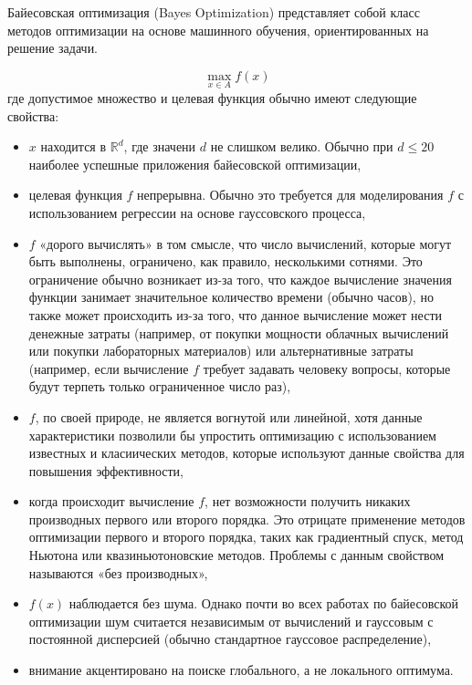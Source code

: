 Байесовская оптимизация (Bayes Optimization) представляет собой класс методов оптимизации на основе машинного обучения, ориентированных на решение задачи.

\begin{equation} \label{eq:17}
 \max\limits_{x \in A}^{} f(x)
\end{equation}
где допустимое множество и целевая функция обычно имеют следующие свойства:
\begin{itemize}
	\item $x$ находится в $\mathbb{R}^d$, где значени $d$ не слишком велико. Обычно при $d \leq 20$ наиболее успешные приложения байесовской оптимизации,
	\item целевая функция $f$ непрерывна. Обычно это требуется для моделирования $f$ с использованием регрессии на основе гауссовского процесса,
	\item $f$ «дорого вычислять» в том смысле, что число вычислений, которые могут быть выполнены, ограничено, как правило, несколькими сотнями. Это ограничение обычно возникает из-за того, что каждое вычисление значения функции занимает значительное количество времени (обычно часов), но также может происходить из-за того, что данное вычисление может нести денежные затраты (например, от покупки мощности облачных вычислений или покупки лабораторных материалов) или альтернативные затраты (например, если вычисление $f$ требует задавать человеку вопросы, которые будут терпеть только ограниченное число раз),
	\item $f$, по своей природе, не является вогнутой или линейной, хотя данные характеристики позволили бы упростить оптимизацию с использованием известных и класиических методов, которые используют данные свойства для повышения эффективности,
	\item когда происходит вычисление $f$, нет возможности получить никаких производных первого или второго порядка. Это отрицате применение методов оптимизации первого и второго порядка, таких как градиентный спуск, метод Ньютона или квазиньютоновские методов. Проблемы с данным свойством называются «без производных»,
	\item $f(x)$ наблюдается без шума. Однако почти во всех работах по байесовской оптимизации шум считается независимым от вычислений и гауссовым с постоянной дисперсией (обычно стандартное гауссовое распределение),
	\item внимание акцентировано на поиске глобального, а не локального оптимума.
\end{itemize}


